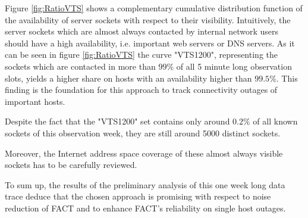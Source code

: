 \documentclass{sigcomm-alternate}
\begin{document}
Figure \ref{fig:RatioVTS} shows a complementary cumulative distribution function of the availability of server sockets with respect to their visibility. Intuitively, the server sockets which are almost always contacted by internal network users should have a high availability, i.e. important web servers or DNS servers. As it can be seen in figure \ref{fig:RatioVTS} the curve "VTS1200", representing the sockets which are contacted in more than $99\%$ of all 5 minute long observation slots, yields a higher share on hosts with an availability higher than $99.5\%$. This finding is the foundation for this approach to track connectivity outages of important hosts. 

Despite the fact that the "VTS1200" set contains only around $0.2\%$ of all known sockets of this observation week, they are still around 5000 distinct sockets.

Moreover, the Internet address space coverage of these almost always visible sockets has to be carefully reviewed.

To sum up, the results of the preliminary analysis of this one week long data trace deduce that the chosen approach is promising with respect to noise reduction of FACT and to enhance FACT's reliability on single host outages.


 
% 

\end{document}
